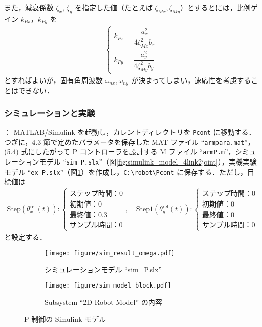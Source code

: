 また，減衰係数 $\zeta_x$, $\zeta_y$ を指定した値（たとえば $\zeta_{Mx}, \zeta_{My}$）とするとには，比例ゲイン $k_{Px}$，$k_{Py}$ を
\begin{align}
    \begin{cases}
        k_{Px} = \dfrac{a_x^2}{4\zeta_{Mx}^2 b_x} \\
        k_{Py} = \dfrac{a_y^2}{4\zeta_{My}^2 b_y}
    \end{cases}
    \tag{5.5}
\end{align}
とすればよいが，固有角周波数 $\omega_{nx}, \omega_{ny}$ が決まってしまい，速応性を考慮することはできない．

\subsubsection{シミュレーションと実験}

：
MATLAB/Simulink を起動し，カレントディレクトリを \texttt{\textyen Pcont} に移動する．つぎに，4.3 節で定めたパラメータを保存した MAT ファイル ``\texttt{armpara.mat}''，(5.4) 式にしたがって P コントローラを設計する M ファイル ``\texttt{armP.m}''，シミュレーションモデル ``\texttt{sim\_P.slx}''（図\ref{fig:simulink_model_4link2joint}），実機実験モデル ``\texttt{ex\_P.slx}''（図\ref{fig:sim_param}）を作成し，\texttt{C:\textbackslash robot\textbackslash Pcont} に保存する．ただし，目標値は
\begin{align}
    \mathrm{Step}\left(\theta_x^{\mathrm{ref}}(t)\right)\colon
    \begin{cases}
        \text{ステップ時間：}0 \\
        \text{初期値：}0 \\
        \text{最終値：}0.3 \\
        \text{サンプル時間：}0
    \end{cases}
    ,\quad
    \mathrm{Step1}\left(\theta_y^{\mathrm{ref}}(t)\right)\colon
    \begin{cases}
        \text{ステップ時間：}0 \\
        \text{初期値：}0 \\
        \text{最終値：}0 \\
        \text{サンプル時間：}0
    \end{cases}
    \tag{5.6}
\end{align}
と設定する．

\begin{figure}[htbp]
    \centering
    \begin{subfigure}[b]{0.7\linewidth}
        \centering
        \texttt{[image: figure/sim\_result\_omega.pdf]}
        \caption{シミュレーションモデル ``sim\_P.slx''}
    \end{subfigure}
    \hfill
    \begin{subfigure}[b]{0.45\linewidth}
        \centering
        \texttt{[image: figure/sim\_model\_block.pdf]}
        \caption{Subsystem ``2D Robot Model'' の内容}
    \end{subfigure}
    \caption{P 制御の Simulink モデル}
    \label{fig:sim_param}
\end{figure}


